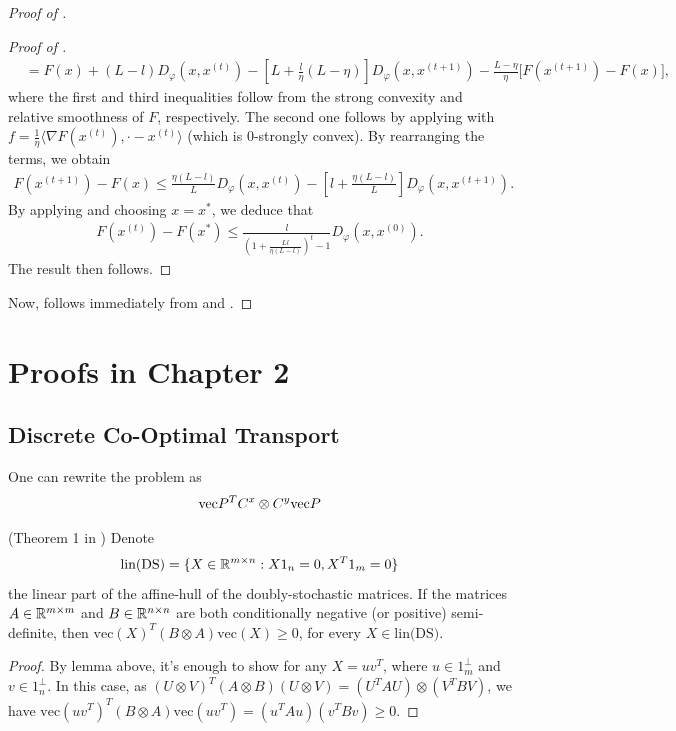 \begin{proof}[Proof of ]
\begin{proof}[Proof of ]
\begin{align}
    &= F(x) + (L - l) D_{\varphi}(x, x^{(t)})
    - \left[ L + \frac{l}{\eta}(L - \eta) \right] D_{\varphi}(x, x^{(t+1)})
    - \frac{L - \eta}{\eta} \big[ F(x^{(t+1)}) - F(x) \big],
\end{align}
where the first and third inequalities follow from the strong convexity and
relative smoothness of $F$, respectively. The second one follows by applying
 with
$f = \frac{1}{\eta} \langle \nabla F(x^{(t)}), \cdot - x^{(t)} \rangle$
(which is $0$-strongly convex). By rearranging the terms, we obtain
\begin{align}
    F(x^{(t+1)}) - F(x) \leq \frac{\eta(L-l)}{L} D_{\varphi}(x, x^{(t)})
    - \left[ l + \frac{\eta (L - l)}{L} \right] D_{\varphi}(x, x^{(t+1)}).
\end{align}
By applying  and choosing $x = x^*$, we deduce that
\begin{align}
    F(x^{(t)}) - F(x^*) \leq \frac{l}{\left( 1 + \frac{Ll }{\eta (L - l)} \right)^t - 1}
    D_{\varphi}(x, x^{(0)}).
\end{align}
The result then follows.
\end{proof}
Now,  follows immediately from  and
.
\end{proof}

\section{Proofs in Chapter 2}

\subsection{Discrete Co-Optimal Transport}

One can rewrite the problem as
\begin{align}
  \text{vec}{P}^T C^x \otimes C^y \text{vec}{P}
\end{align}
\begin{proposition}
  (Theorem 1 in \citep{Maron18}) Denote
\begin{equation}
    \text{lin(DS)} = \{X \in \mathbb R^{m \times n}: X 1_n = 0, X^T 1_m = 0 \}
\end{equation}
the linear part of the affine-hull of the doubly-stochastic matrices. If the matrices $A \in \mathbb R^{m \times m}$ and
  $B \in \mathbb R^{n \times n}$ are both conditionally negative (or positive) semi-definite, then $\text{vec}(X)^T (B \otimes A) \text{vec}(X) \geq 0$, for every $X \in \text{lin(DS)}$.
\end{proposition}
\begin{proof}
    By lemma above, it's enough to show for any $X = u v^T$, where $u \in 1^{\perp}_m$
    and $v \in 1^{\perp}_n$. In this case, as
    $(U \otimes V)^T (A \otimes B) (U \otimes V) = (U^T A U) \otimes (V^T B V)$, we have
    $\text{vec}(u v^T)^T (B \otimes A) \text{vec}(u v^T) = (u^T A u) (v^T B v) \geq 0$.
\end{proof}

